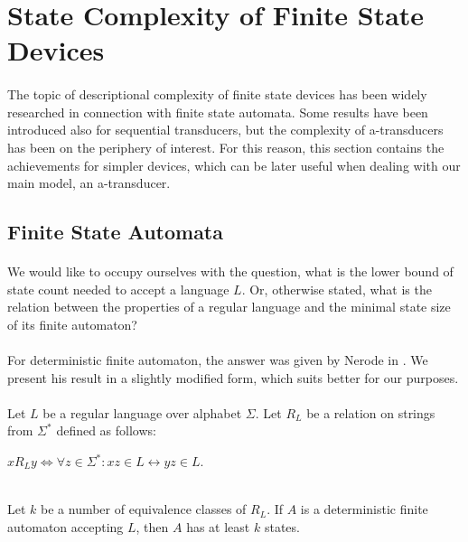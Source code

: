 \section{State Complexity of Finite State Devices}
\paragraph{}
The topic of descriptional complexity of finite state devices has been widely researched in connection with finite state automata. Some results have been introduced also for sequential transducers, but the complexity of a-transducers has been on the periphery of interest. For this reason, this section contains the achievements for simpler devices, which can be later useful when dealing with our main model, an a-transducer.

\subsection{Finite State Automata}
\paragraph{}
We would like to occupy ourselves with the question, what is the lower bound of state count needed to accept a language $L$. Or, otherwise stated, what is the relation between the properties of a regular language and the minimal state size of its finite automaton?

\paragraph{}
For deterministic finite automaton, the answer was given by Nerode in \cite{Nerode:LAT}. We present his result in a slightly modified form, which suits better for our purposes.

\paragraph{}
\cveta Let $L$ be a regular language over alphabet $\Sigma $. Let $R_{L}$ be a relation on strings from $\Sigma ^{*}$ defined as follows: \\
\centerline{$xR_{L}y \Leftrightarrow \forall z \in \Sigma ^{*}: xz \in L \leftrightarrow yz\in L$.}\\
Let $k$ be a number of equivalence classes of $R_{L}$. If $A$ is a deterministic finite automaton accepting $L$, then $A$ has at least $k$ states.

